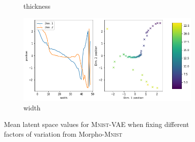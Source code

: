 \begin{figure}[H]
\begin{subfigure}{.48\textwidth}
        \caption{thickness}
    \end{subfigure}
    \begin{subfigure}{.48\textwidth}
        \includegraphics[width=\textwidth]{images/latent_space_traversals/vae_mnist_morpho_latent_space_values_width.png}
        \caption{width}
    \end{subfigure}
    \caption[\textsc{Mnist}-VAE - Latent Space Values]{Mean latent space values for \textsc{Mnist}-VAE when fixing different factors of variation from Morpho-\textsc{Mnist}}
    \label{fig:vae_mnist_morpho_latent_space_values}
\end{figure}

